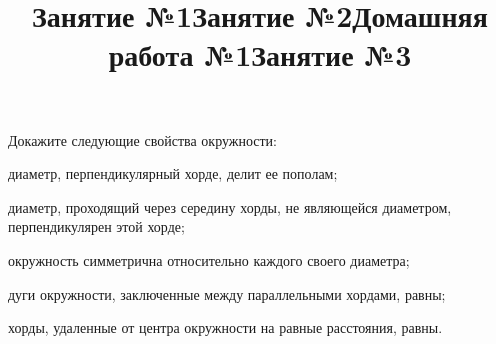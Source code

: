 \title{Занятие №1}
\begin{listofex}
	\item {}
	\item {}
	\item {}
	\item {}
	\item {}
	\item {}
	\item {}
	\item {}
\end{listofex}
\newpage
\title{Занятие №2}
\begin{listofex}
	\item {}
	\item {}
	\item {}
	\item {}
	\item {}
	\item {}
	\item {}
	\item {}
	\item {}
\end{listofex}
\newpage
\title{Домашняя работа №1}
\begin{listofex}
	\item {}
	\item {}
	\item {}
	\item {}
	\item {}
	\item {}
	\item {}
\end{listofex}
\newpage
\title{Занятие №3}
\begin{listofex}
	\item Докажите следующие свойства окружности:
	\begin{enumcols}[itemcolumns=1]
		\item диаметр, перпендикулярный хорде, делит ее пополам;
		\item диаметр, проходящий через середину хорды, не являющейся диаметром, перпендикулярен этой хорде;
		\item окружность симметрична относительно каждого своего
		диаметра;
		\item дуги окружности, заключенные между параллельными
		хордами, равны;
		\item хорды, удаленные от центра окружности на равные расстояния, равны.
	\end{enumcols}
	\item {}
	\item {}
	\item {}
	\item {}
	\item {}
\end{listofex}
